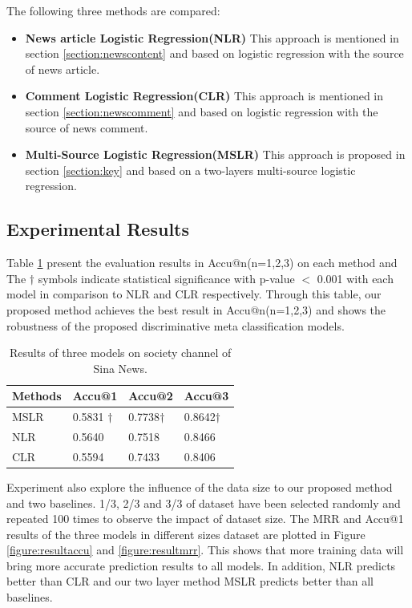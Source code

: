 \documentclass{IEEEtran}
\begin{document}
The following three methods are compared:
\begin{itemize}

\item \textbf{News article Logistic Regression(NLR)}
This approach is mentioned in section \ref{section:newscontent} and based on logistic regression with the source of news article.
\item \textbf{Comment Logistic Regression(CLR)}
This approach is mentioned in section \ref{section:newscomment} and based on logistic regression with the source of news comment.
\item  \textbf{Multi-Source Logistic Regression(MSLR)}
This approach is proposed in section \ref{section:key} and based on a two-layers multi-source logistic regression.

\end{itemize}


\subsection{Experimental Results}


Table \ref{tab:accu@n} present the evaluation results in Accu@n(n=1,2,3) on each method and The $\dagger$ symbols indicate statistical significance with p-value $<$ 0.001 with each model in comparison to NLR and CLR respectively. Through this table, our proposed method achieves the best result in Accu@n(n=1,2,3) and shows the robustness of the proposed discriminative meta classification models.
\begin{table}[!h]
	\centering
	\caption{Results of three models on society channel of Sina News.}
	\begin{tabular}{l l l l}
		\hline
		Methods & Accu@1 & Accu@2 & Accu@3\\
		\hline
		MSLR & 0.5831 $\dagger$ & 0.7738$\dagger$ & 0.8642$\dagger$ \\
		NLR & 0.5640 & 0.7518 & 0.8466 \\
		CLR & 0.5594 & 0.7433 & 0.8406 \\
		\hline
	\end{tabular}
	\label{tab:accu@n}
\end{table}


Experiment also explore the influence of the data size to our proposed method and two baselines. 1/3, 2/3 and 3/3 of dataset have been selected randomly and repeated 100 times to observe the impact of dataset size.
The MRR and Accu@1 results of the three models in different sizes dataset are plotted in Figure \ref{figure:resultaccu} and \ref{figure:resultmrr}. This shows that more training data will bring more accurate prediction results to all models. In addition, NLR predicts better than CLR and our two layer method MSLR predicts better than all baselines.
\end{document}

